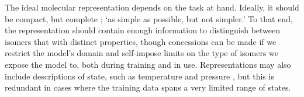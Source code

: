 The ideal molecular representation depends on the task at hand. Ideally, it
should be compact, but complete
\cite{faberCrystalStructureRepresentations2015,himanenDScribeLibraryDescriptors2020};
`as simple as possible, but not simpler.' To that end, the representation should
contain enough information to distinguish between isomers that with distinct
properties, though concessions can be made if we restrict the model's domain and
self-impose limits on the type of isomers we expose the model to, both during
training and in use. Representations may also include descriptions of state,
such as temperature and pressure \cite{chenGraphNetworksUniversal2019}, but this
is redundant in cases where the training data spans a very limited range of
states.





